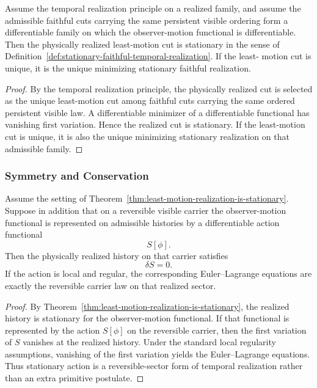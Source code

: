 \begin{theorem}
\label{thm:least-motion-realization-is-stationary}
Assume the temporal realization principle on a realized family, and assume the
admissible faithful cuts carrying the same persistent visible ordering form a
differentiable family on which the observer-motion functional is differentiable.
Then the physically realized least-motion cut is stationary in the sense of
Definition~\ref{def:stationary-faithful-temporal-realization}. If the least-
motion cut is unique, it is the unique minimizing stationary faithful
realization.
\end{theorem}

\begin{proof}
By the temporal realization principle, the physically realized cut is selected
as the unique least-motion cut among faithful cuts carrying the same ordered
persistent visible law. A differentiable minimizer of a differentiable
functional has vanishing first variation. Hence the realized cut is stationary.
If the least-motion cut is unique, it is also the unique minimizing stationary
realization on that admissible family.
\end{proof}

\subsubsection{Symmetry and Conservation}

\begin{corollary}
\label{cor:stationary-action-on-reversible-realized-sectors}
Assume the setting of
Theorem~\ref{thm:least-motion-realization-is-stationary}. Suppose in addition
that on a reversible visible carrier the observer-motion functional is
represented on admissible histories by a differentiable action functional
\[
S[\phi].
\]
Then the physically realized history on that carrier satisfies
\[
\delta S = 0.
\]
If the action is local and regular, the corresponding Euler--Lagrange
equations are exactly the reversible carrier law on that realized sector.
\end{corollary}

\begin{proof}
By Theorem~\ref{thm:least-motion-realization-is-stationary}, the realized
history is stationary for the observer-motion functional. If that functional is
represented by the action \(S[\phi]\) on the reversible carrier, then the
first variation of \(S\) vanishes at the realized history. Under the standard
local regularity assumptions, vanishing of the first variation yields the
Euler--Lagrange equations. Thus stationary action is a reversible-sector form
of temporal realization rather than an extra primitive postulate.
\end{proof}

